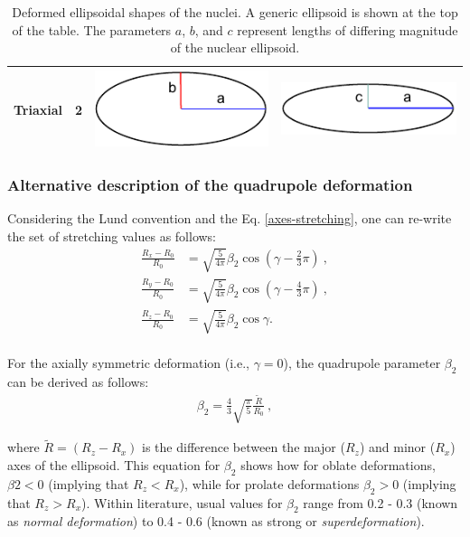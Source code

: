 \begin{table}[ht]
\begin{tabular}{|c|c|c|c|}
        Triaxial & 2                                                              &   \includegraphics[scale=0.7]{Chapters/Figures/ellipse_triaxial_1.pdf}  &     \includegraphics[scale=0.7]{Chapters/Figures/ellipse_triaxial_2.pdf}      \\ \hline
        \end{tabular}
    \caption{Deformed ellipsoidal shapes of the nuclei. A generic ellipsoid is shown at the top of the table. The parameters $a$, $b$, and $c$ represent lengths of differing magnitude of the nuclear ellipsoid.}
    \label{table-ellipsoidal-shapes}
    \end{table}

    \subsubsection{Alternative description of the quadrupole deformation}

    Considering the Lund convention and the Eq. \ref{axes-stretching}, one can re-write the set of stretching values as follows:
    \begin{align}
        \frac{R_x-R_0}{R_0}&=\sqrt{\frac{5}{4\pi}}\beta_2\cos\left(\gamma-\frac{2}{3}\pi\right)\ , \\
        \frac{R_y-R_0}{R_0}&=\sqrt{\frac{5}{4\pi}}\beta_2\cos\left(\gamma-\frac{4}{3}\pi\right)\ , \\
        \frac{R_z-R_0}{R_0}&=\sqrt{\frac{5}{4\pi}}\beta_2\cos\gamma. \\
    \end{align}

For the axially symmetric deformation (i.e., $\gamma=0$), the quadrupole parameter $\beta_2$ can be derived as follows:
\begin{align}
    \beta_2=\frac{4}{3}\sqrt{\frac{\pi}{5}}\frac{\tilde{R}}{R_0}\ ,
\end{align}

where $\tilde{R}=(R_z-R_x)$ is the difference between the major ($R_z$) and minor ($R_x$) axes of the ellipsoid. This equation for $\beta_2$ shows how for oblate deformations, $\beta2<0$ (implying that $R_z<R_x$), while for prolate deformations $\beta_2>0$ (implying that $R_z>R_x$). Within literature, usual values for $\beta_2$ range from 0.2 - 0.3 (known as \emph{normal deformation}) to 0.4 - 0.6 (known as strong or \emph{superdeformation}). 

